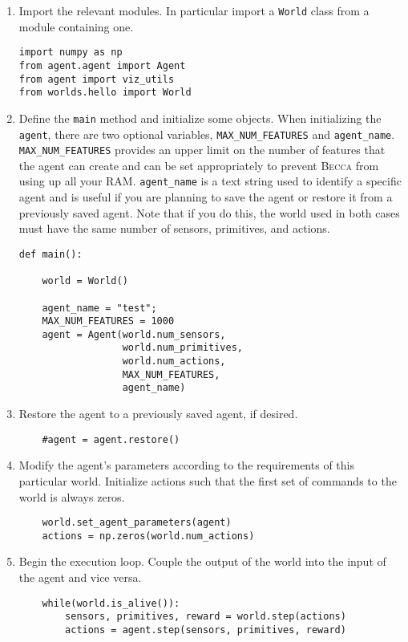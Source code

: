 \begin{enumerate}
\item
Import the relevant modules. In particular import a \texttt{World} class from a module containing one.
\begin{verbatim}
import numpy as np
from agent.agent import Agent
from agent import viz_utils
from worlds.hello import World
\end{verbatim}

\item
Define the \texttt{main} method and initialize some objects. When initializing the \texttt{agent}, there are two optional variables, \texttt{MAX\_NUM\_FEATURES} and \texttt{agent\_name}.  \texttt{MAX\_NUM\_FEATURES} provides an upper limit on the number of features that the agent can create and can be set appropriately to prevent \textsc{Becca} from using up all your RAM. \texttt{agent\_name} is a text string used to identify a specific agent and is useful if you are planning to save the agent or restore it from a previously saved agent. Note that if you do this, the world used in both cases must have the same number of sensors, primitives, and actions.
\begin{verbatim}
def main():
    
    world = World()
    
    agent_name = "test";
    MAX_NUM_FEATURES = 1000
    agent = Agent(world.num_sensors, 
                  world.num_primitives, 
                  world.num_actions, 
                  MAX_NUM_FEATURES, 
                  agent_name)

\end{verbatim}

\item
Restore the agent to a previously saved agent, if desired.
\begin{verbatim}
    #agent = agent.restore()
\end{verbatim}
    
\item
Modify the agent's parameters according to the requirements of this particular world. Initialize actions such that the first set of commands to the world is always zeros.
\begin{verbatim}
    world.set_agent_parameters(agent)
    actions = np.zeros(world.num_actions)
\end{verbatim}

\item
Begin the execution loop. Couple the output of the world into the input of the agent and vice versa.
\begin{verbatim}    
    while(world.is_alive()):
        sensors, primitives, reward = world.step(actions)
        actions = agent.step(sensors, primitives, reward)
\end{verbatim}


\end{enumerate}
